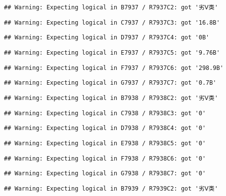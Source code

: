 \documentclass[
]{article}
\begin{document}
\begin{verbatim}
## Warning: Expecting logical in B7937 / R7937C2: got '劣Ⅴ类'
\end{verbatim}

\begin{verbatim}
## Warning: Expecting logical in C7937 / R7937C3: got '16.8B'
\end{verbatim}

\begin{verbatim}
## Warning: Expecting logical in D7937 / R7937C4: got '0B'
\end{verbatim}

\begin{verbatim}
## Warning: Expecting logical in E7937 / R7937C5: got '9.76B'
\end{verbatim}

\begin{verbatim}
## Warning: Expecting logical in F7937 / R7937C6: got '298.9B'
\end{verbatim}

\begin{verbatim}
## Warning: Expecting logical in G7937 / R7937C7: got '0.7B'
\end{verbatim}

\begin{verbatim}
## Warning: Expecting logical in B7938 / R7938C2: got '劣Ⅴ类'
\end{verbatim}

\begin{verbatim}
## Warning: Expecting logical in C7938 / R7938C3: got '0'
\end{verbatim}

\begin{verbatim}
## Warning: Expecting logical in D7938 / R7938C4: got '0'
\end{verbatim}

\begin{verbatim}
## Warning: Expecting logical in E7938 / R7938C5: got '0'
\end{verbatim}

\begin{verbatim}
## Warning: Expecting logical in F7938 / R7938C6: got '0'
\end{verbatim}

\begin{verbatim}
## Warning: Expecting logical in G7938 / R7938C7: got '0'
\end{verbatim}

\begin{verbatim}
## Warning: Expecting logical in B7939 / R7939C2: got '劣Ⅴ类'
\end{verbatim}
\end{document}

